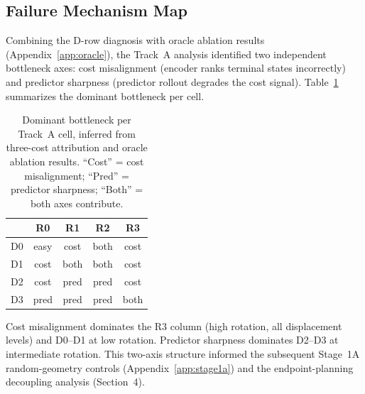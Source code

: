 \subsection{Failure Mechanism Map}
\label{app:failure_map}

Combining the D-row diagnosis with oracle ablation results
(Appendix~\ref{app:oracle}), the Track~A analysis identified two independent
bottleneck axes: cost misalignment (encoder ranks terminal states incorrectly)
and predictor sharpness (predictor rollout degrades the cost signal).
Table~\ref{tab:failure-map} summarizes the dominant bottleneck per cell.

\begin{table}[h]
\centering
\caption{Dominant bottleneck per Track~A cell, inferred from three-cost
attribution and oracle ablation results.  ``Cost'' = cost misalignment;
``Pred'' = predictor sharpness; ``Both'' = both axes contribute.}
\label{tab:failure-map}
\begin{tabular}{lcccc}
\toprule
 & R0 & R1 & R2 & R3 \\
\midrule
D0 & easy & cost & both & cost \\
D1 & cost & both & both & cost \\
D2 & cost & pred & pred & cost \\
D3 & pred & pred & pred & both \\
\bottomrule
\end{tabular}
\end{table}

Cost misalignment dominates the R3 column (high rotation, all displacement
levels) and D0--D1 at low rotation.  Predictor sharpness dominates D2--D3 at
intermediate rotation.  This two-axis structure informed the subsequent
Stage~1A random-geometry controls (Appendix~\ref{app:stage1a}) and the
endpoint-planning decoupling analysis (Section~4).

